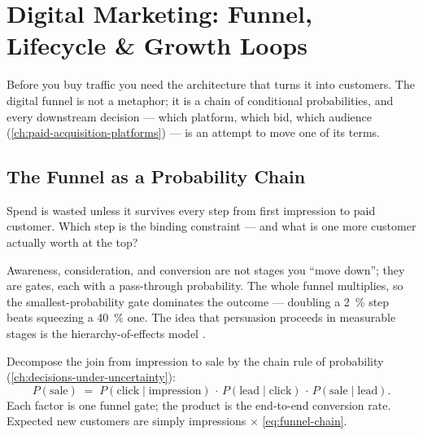 \chapter{Digital Marketing: Funnel, Lifecycle \& Growth Loops}\label{ch:digital-funnel-and-crm}


Before you buy traffic you need the architecture that turns it into customers. The digital funnel is not a metaphor; it is a chain of conditional probabilities, and every downstream decision --- which platform, which bid, which audience (\cref{ch:paid-acquisition-platforms}) --- is an attempt to move one of its terms.

\section{The Funnel as a Probability Chain}\label{sec:funnel-chain}

\begin{decision}
Spend is wasted unless it survives every step from first impression to paid customer. Which step is the binding constraint --- and what is one more customer actually worth at the top?
\end{decision}

\begin{intuition}
Awareness, consideration, and conversion are not stages you ``move down''; they are gates, each with a pass-through probability. The whole funnel multiplies, so the smallest-probability gate dominates the outcome --- doubling a \qty{2}{\percent} step beats squeezing a \qty{40}{\percent} one. The idea that persuasion proceeds in measurable stages is the hierarchy-of-effects model \parencite{lavidge1961model,barry1987development}.
\end{intuition}

\begin{derivation}
Decompose the join from impression to sale by the chain rule of probability (\cref{ch:decisions-under-uncertainty}):
\begin{equation}\label{eq:funnel-chain}
  P(\text{sale}) \;=\; P(\text{click}\mid\text{impression})\,\cdot\,P(\text{lead}\mid\text{click})\,\cdot\,P(\text{sale}\mid\text{lead}).
\end{equation}
Each factor is one funnel gate; the product is the end-to-end conversion rate. Expected new customers are simply impressions $\times$ \cref{eq:funnel-chain}.
\end{derivation}

